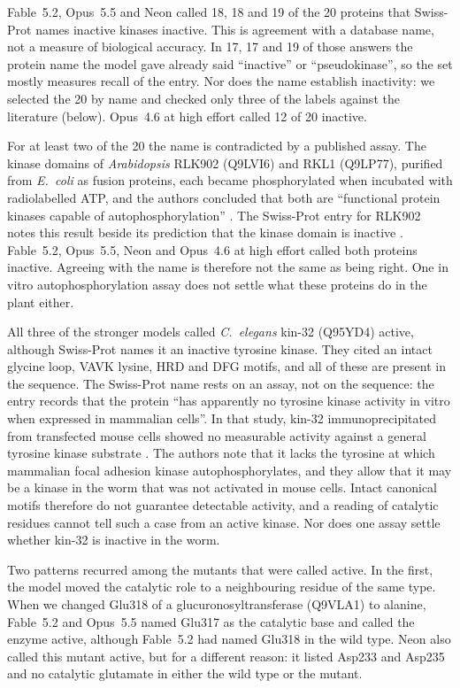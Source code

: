 \documentclass[11pt]{article}
\begin{document}
Fable~5.2, Opus~5.5 and Neon called 18, 18 and 19 of the 20 proteins that Swiss-Prot names inactive
kinases inactive. This is agreement with a database name, not a measure of biological accuracy. In 17, 17
and 19 of those answers the protein name the model gave already said ``inactive'' or ``pseudokinase'', so
the set mostly measures recall of the entry. Nor does the name establish inactivity: we selected the 20
by name and checked only three of the labels against the literature (below). Opus~4.6 at high effort called 12 of 20
inactive.

For at least two of the 20 the name is contradicted by a published assay. The kinase domains of
\textit{Arabidopsis} RLK902 (Q9LVI6) and RKL1 (Q9LP77), purified from \textit{E.~coli} as fusion
proteins, each became phosphorylated when incubated with radiolabelled ATP, and the authors concluded
that both are ``functional protein kinases capable of autophosphorylation'' \citep{tarutani2004rlk902}.
The Swiss-Prot entry for RLK902 notes this result beside its prediction that the kinase domain is inactive
\citep{uniprot}. Fable~5.2, Opus~5.5, Neon and Opus~4.6 at high effort called both proteins inactive.
Agreeing with the name is therefore not the same as being right. One in vitro autophosphorylation assay does
not settle what these proteins do in the plant either.

All three of the stronger models called \textit{C.~elegans} kin-32 (Q95YD4) active, although Swiss-Prot
names it an inactive tyrosine kinase. They cited an intact glycine loop, VAVK lysine, HRD and DFG motifs,
and all of these are present in the sequence. The Swiss-Prot name rests on an assay, not on the sequence:
the entry records that the protein ``has apparently no tyrosine kinase activity in vitro when expressed in
mammalian cells''. In that study, kin-32 immunoprecipitated from transfected mouse cells showed no
measurable activity against a general tyrosine kinase substrate \citep{cram2008kin32}. The authors note
that it lacks the tyrosine at which mammalian focal adhesion kinase autophosphorylates, and they allow
that it may be a kinase in the worm that was not activated in mouse cells. Intact canonical motifs
therefore do not guarantee detectable activity, and a reading
of catalytic residues cannot tell such a case from an active kinase. Nor does one assay settle whether
kin-32 is inactive in the worm.

Two patterns recurred among the mutants that were called active. In the first, the model moved the catalytic role to a neighbouring residue of
the same type. When we changed Glu318 of a glucuronosyltransferase (Q9VLA1) to alanine, Fable~5.2 and
Opus~5.5 named Glu317 as the catalytic base and called the enzyme active, although Fable~5.2 had named
Glu318 in the wild type. Neon also called this mutant active, but for a different reason: it listed
Asp233 and Asp235 and no catalytic glutamate in either the wild type or the mutant.
\end{document}
